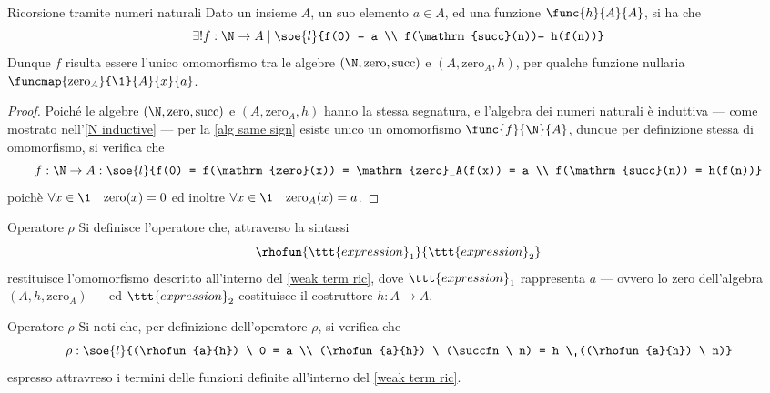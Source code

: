 \documentclass[a4paper, 12pt]{report}
\begin{document}
    \begin{framedlem}[label={weak term ric}]{Ricorsione tramite numeri naturali}
        Dato un insieme $A$, un suo elemento $a \in A$, ed una funzione $\func{h}{A}{A}$, si ha che $$\exists ! f: \N \to A \mid \soe{l}{f(0) = a \\ f(\mathrm{succ}(n))= h(f(n))}$$ Dunque $f$ risulta essere l'unico omomorfismo tra le algebre $(\N, \mathrm{zero}, \mathrm{succ})$ e $(A, \mathrm{zero}_A, h)$, per qualche funzione nullaria $\funcmap{\mathrm{zero}_A}{\1}{A}{x}{a}$.
    \end{framedlem}

    \begin{proof}
        Poiché le algebre $(\N, \mathrm{zero}, \mathrm{succ})$ e $(A, \mathrm{zero}_A, h)$ hanno la stessa segnatura, e l'algebra dei numeri naturali è induttiva --- come mostrato nell'\cref{N inductive} --- per la \cref{alg same sign} esiste unico un omomorfismo $\func{f}{\N}{A}$, dunque per definizione stessa di omomorfismo, si verifica che $$f:\N \to A :\soe{l}{f(0) = f(\mathrm{zero}(x)) = \mathrm{zero}_A(f(x)) = a \\ f(\mathrm{succ}(n)) = h(f(n))}$$ poichè $\forall x \in \1 \quad \mathrm{zero}(x) = 0$ ed inoltre $\forall x \in \1 \quad \mathrm{zero}_A(x) = a$.
    \end{proof}

    \begin{frameddefn}{Operatore $\rho$}
        Si definisce  l'operatore che, attraverso la sintassi $$\rhofun{\ttt{expression}_1}{\ttt{expression}_2}$$ restituisce l'omomorfismo descritto all'interno del \cref{weak term ric}, dove $\ttt{expression}_1$ rappresenta $a$ --- ovvero lo zero dell'algebra $(A, h, \mathrm{zero}_A)$ --- ed $\ttt{expression}_2$ costituisce il costruttore $h: A \to A$.
    \end{frameddefn}

    \begin{framedobs}[label={rho obs}]{Operatore $\rho$}
        Si noti che, per definizione dell'operatore $\rho$, si verifica che $$\rho : \soe{l}{(\rhofun{a}{h}) \ 0 = a \\ (\rhofun{a}{h}) \ (\succfn \ n) = h \ ((\rhofun{a}{h}) \ n)}$$ espresso attravreso i termini delle funzioni definite all'interno del \cref{weak term ric}.
    \end{framedobs}
\end{document}

